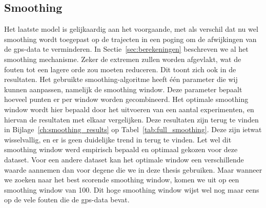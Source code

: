 \subsection{Smoothing}
Het laatste model is gelijkaardig aan het voorgaande, met als verschil dat nu
wel smoothing wordt toegepast op de trajecten in een poging om de afwijkingen
van de \ac{gps}-data te verminderen. In Sectie~\ref{sec:berekeningen}
beschreven we al het smoothing mechanisme. Zeker de extremen zullen worden
afgevlakt, wat de fouten tot een lagere orde zou moeten reduceren. Dit toont
zich ook in de resultaten. Het gebruikte smoothing-algoritme heeft één
parameter die wij kunnen aanpassen, namelijk de smoothing window. Deze
parameter bepaalt hoeveel punten er per window worden gecombineerd. Het
optimale smoothing window wordt hier bepaald door het uitvoeren van een aantal
experimenten, en hiervan de resultaten met elkaar vergelijken. Deze resultaten
zijn terug te vinden in Bijlage~\ref{ch:smoothing_results} op
Tabel~\ref{tab:full_smoothing}. Deze zijn ietwat wisselvallig, en er is geen
duidelijke trend in terug te vinden. Let wel dit smoothing window werd
empirisch bepaald en optimaal gekozen voor deze dataset. Voor een andere
dataset kan het optimale window een verschillende waarde aannemen dan voor
degene die we in deze thesis gebruiken.
Maar wanneer we zoeken naar het best scorende smoothing window, komen we uit op
een smoothing window van 100. Dit hoge smoothing window wijst wel nog maar eens
op de vele fouten die de \ac{gps}-data bevat.


